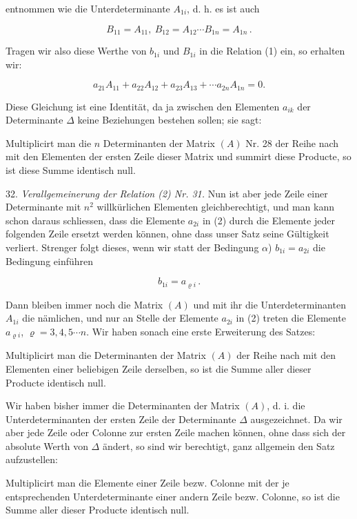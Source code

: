 \documentclass[11pt]{article}
\providecommand{\weberpage}[1]{}
\providecommand{\weq}[2]{\begin{equation}\tag{#1}#2\end{equation}}
\let\Delta\varDelta
\begin{document}
entnommen wie die Unterdeterminante $A_{1i}$, d. h. es ist auch

\[
B_{11}=A_{11},\ B_{12}=A_{12}\cdots B_{1n}=A_{1n}\, .
\]

Tragen wir also diese Werthe von $b_{1i}$ und $B_{1i}$ in die Relation (1)
ein, so erhalten wir:

\weq{2}{a_{21}A_{11}+a_{22}A_{12}+a_{23}A_{13}+\cdots a_{2n}A_{1n}=0.}

Diese Gleichung ist eine Identität, da ja zwischen den Elementen $a_{ik}$
der Determinante $\Delta$ keine Beziehungen bestehen sollen; sie sagt:

\glqq Multiplicirt man die $n$ Determinanten der Matrix $(A)$ Nr. 28 der
Reihe nach mit den Elementen der ersten Zeile dieser Matrix und summirt
diese Producte, so ist diese Summe identisch null.\grqq{}

32. \textit{Verallgemeinerung der Relation (2) Nr. 31.} Nun ist aber jede
Zeile einer Determinante mit $n^2$ willkürlichen Elementen
gleichberechtigt, und man kann schon daraus schliessen, dass die Elemente
$a_{2i}$ in (2) durch die Elemente jeder folgenden Zeile ersetzt werden
können, ohne dass unser Satz seine Gültigkeit verliert. Strenger folgt
dieses, wenn wir statt der Bedingung $\alpha$) $b_{1i}=a_{2i}$ die
Bedingung einführen

\[
b_{1i}=a_{\varrho i}\, .
\]

Dann bleiben immer noch die Matrix $(A)$ und mit ihr die
Unterdeterminanten $A_{1i}$ die nämlichen, und nur an Stelle der Elemente
$a_{2i}$ in (2) treten die Elemente $a_{\varrho i}$, $\varrho=3,4,5\cdots
n$. Wir haben sonach eine erste Erweiterung des Satzes:

\glqq Multiplicirt man die Determinanten der Matrix $(A)$ der Reihe nach
mit den Elementen einer beliebigen Zeile derselben, so ist die Summe
aller dieser Producte identisch null.\grqq{}


\weberpage{38}
Wir haben bisher immer die Determinanten der Matrix $(A)$, d. i. die
Unterdeterminanten der ersten Zeile der Determinante $\Delta$
ausgezeichnet. Da wir aber jede Zeile oder Colonne zur ersten Zeile
machen können, ohne dass sich der absolute Werth von $\Delta$ ändert, so
sind wir berechtigt, ganz allgemein den Satz aufzustellen:

\glqq Multiplicirt man die Elemente einer Zeile bezw. Colonne mit der je
entsprechenden Unterdeterminante einer andern Zeile bezw. Colonne, so ist
die Summe aller dieser Producte identisch null.\grqq{}
\end{document}
